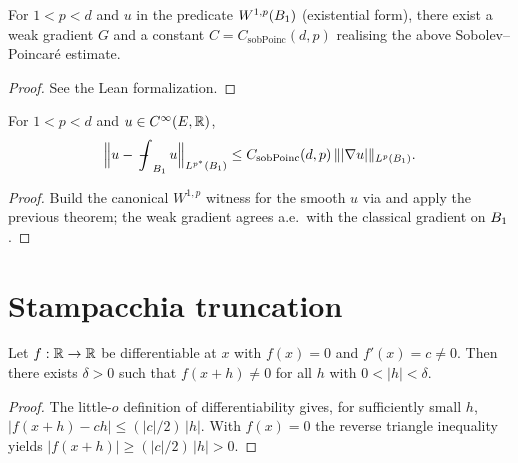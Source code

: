 \begin{corollary}
\label{cor:sobolev_poincare_unitBall}
\leanok
{}
For $1 < p < d$ and $u$ in the predicate $W^{1,p}(B_{1})$ (existential form), there
exist a weak gradient $G$ and a constant $C = C_{\mathrm{sobPoinc}}(d,p)$ realising the
above Sobolev--Poincar\'e estimate.
\end{corollary}

\begin{proof}
\leanok
{}
See the Lean formalization.
\end{proof}

\begin{corollary}
\label{cor:sobolev_poincare_smooth_unitBall}
\leanok
{}
For $1 < p < d$ and $u \in C^{\infty}(E,\mathbb{R})$,
\begin{equation*}
\Bigl\lVert u - \fint_{\Bz{1}} u \Bigr\rVert_{\Lp{p^{*}}(\Bz{1})}
\le C_{\mathrm{sobPoinc}}(d,p)\,\lVert\lvert\nabla u\rvert\rVert_{\Lp{p}(\Bz{1})}.
\end{equation*}
\end{corollary}
\begin{proof}
\leanok
{}

Build the canonical $W^{1,p}$ witness for the smooth $u$ via
 and apply the previous theorem; the weak
gradient agrees a.e.\ with the classical gradient on $B_{1}$.
\end{proof}

\section{Stampacchia truncation}

\begin{lemma}
\label{lem:deriv_ne_zero_implies_isolated_zero}
\leanok
Let $f : \mathbb{R} \to \mathbb{R}$ be differentiable at $x$ with $f(x)=0$ and $f'(x) = c \neq 0$. Then
there exists $\delta > 0$ such that $f(x+h) \neq 0$ for all $h$ with $0 < \lvert h\rvert < \delta$.
\end{lemma}
\begin{proof}
\leanok

The little-$o$ definition of differentiability gives, for sufficiently small $h$,
$\lvert f(x+h) - c h\rvert \le (\lvert c\rvert/2)\, \lvert h\rvert$. With $f(x)=0$
the reverse triangle inequality yields $\lvert f(x+h)\rvert \ge (\lvert c\rvert/2)\,
\lvert h\rvert > 0$.
\end{proof}

